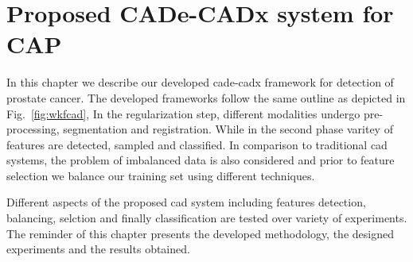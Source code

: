 \chapter{Proposed CADe-CADx system for CAP}\label{chap:6}
In this chapter we describe our developed \ac{cade}-\ac{cadx} framework for detection of prostate cancer.
The developed frameworks follow the same outline as depicted in Fig.~\ref{fig:wkfcad}, 
In the regularization step, different modalities undergo pre-processing, segmentation and registration. 
While in the second phase varitey of features are detected, sampled and classified.
In comparison to traditional \ac{cad} systems, the problem of imbalanced data is also considered and prior to feature selection we balance our training set using different techniques.

Different aspects of the proposed \ac{cad} system including features detection, balancing, selction and finally classification are tested over variety of experiments.
The reminder of this chapter presents the developed methodology, the designed experiments and the results obtained.



